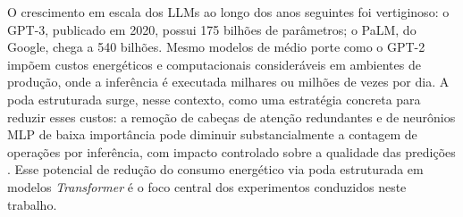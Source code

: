 O crescimento em escala dos LLMs ao longo dos anos seguintes foi vertiginoso: o GPT-3,
publicado em 2020, possui 175 bilhões de parâmetros; o PaLM, do Google, chega a 540
bilhões. Mesmo modelos de médio porte como o GPT-2 impõem custos energéticos e
computacionais consideráveis em ambientes de produção, onde a inferência é executada
milhares ou milhões de vezes por dia. A poda estruturada surge, nesse contexto, como uma
estratégia concreta para reduzir esses custos: a remoção de cabeças de atenção
redundantes e de neurônios MLP de baixa importância pode diminuir substancialmente a
contagem de operações por inferência, com impacto controlado sobre a qualidade das
predições \cite{Patterson2021}. Esse potencial de redução do consumo energético via poda
estruturada em modelos \textit{Transformer} é o foco central dos experimentos conduzidos
neste trabalho.
